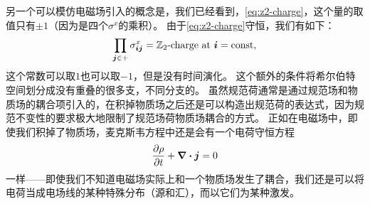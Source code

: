 另一个可以模仿电磁场引入的概念是，我们已经看到，\eqref{eq:z2-charge}，这个量的取值只有$\pm 1$（因为是四个$\sigma^x$的乘积）。
由于\eqref{eq:z2-charge}守恒，我们有如下：
\begin{equation}
    \prod_{\vb*{j} \in +} \sigma^x_{\vb*{i} \vb*{j}} = \text{$\mathbb{Z}_2$-charge at $\vb*{i}$} = \mathrm{const},
    \label{eq:gauss-z2}
\end{equation}
这个常数可以取$1$也可以取$-1$，但是没有时间演化。
这个额外的条件将希尔伯特空间划分成没有重叠的很多支，不同分支的。
虽然规范荷通常是通过规范场和物质场的耦合项引入的，在积掉物质场之后还是可以构造出规范荷的表达式，因为规范不变性的要求极大地限制了规范场荷物质场耦合的方式。
正如在电磁场中，即使我们积掉了物质场，麦克斯韦方程中还是会有一个电荷守恒方程
\[
    \pdv{\rho}{t} + \div{\vb*{j}} = 0
\]
一样——即使我们不知道电磁场实际上和一个物质场发生了耦合，我们还是可以将电荷当成电场线的某种特殊分布（源和汇），而以它们为某种激发。%
